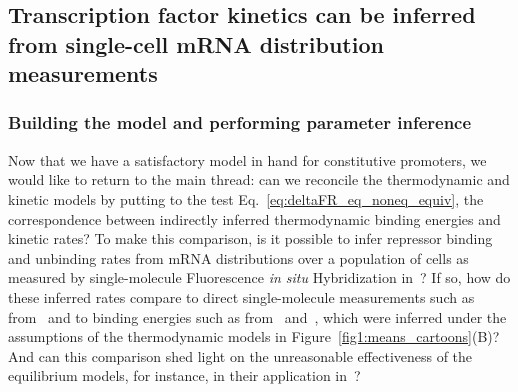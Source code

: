 \subsection{Transcription factor kinetics can be inferred from single-cell mRNA
distribution measurements}\label{sec:rep_kinetics_inference}
\subsubsection{Building the model and performing parameter inference}

Now that we have a satisfactory model in hand for constitutive promoters, we
would like to return to the main thread: can we reconcile the thermodynamic and
kinetic models by putting to the test Eq.~\ref{eq:deltaFR_eq_noneq_equiv}, the
correspondence between indirectly inferred thermodynamic binding energies and
kinetic rates? To make this comparison, is it possible to infer repressor
binding and unbinding rates from mRNA distributions over a population of cells
as measured by single-molecule Fluorescence \textit{in situ} Hybridization
in~\cite{Jones2014}? If so, how do these inferred rates compare to direct
single-molecule measurements such as from~\cite{Hammar2014} and to binding
energies such as from~\cite{Garcia2011a} and~\cite{Razo-Mejia2018}, which were
inferred under the assumptions of the thermodynamic models in
Figure~\ref{fig1:means_cartoons}(B)? And can this comparison shed light on the
unreasonable effectiveness of the equilibrium models, for instance, in their
application in~\cite{Chure2019, Chure2019a}?

